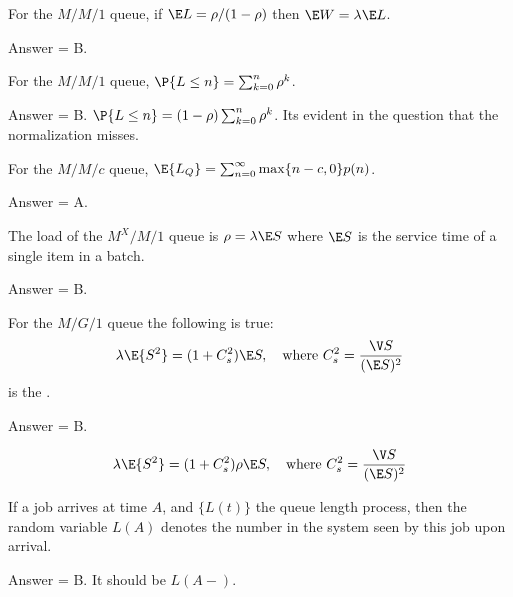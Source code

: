 \begin{exercise}[201803]
For the $M/M/1$ queue, if $\E L = \rho/(1-\rho)$ then $\E W = \lambda \E L$.
\begin{solution}
Answer = B.
\end{solution}
\end{exercise}

\begin{exercise}[201803]
For the $M/M/1$ queue, $\P{L\leq n} = \sum_{k=0}^n \rho^k$.
\begin{solution}
Answer = B. $\P{L\leq n} = (1-\rho)\sum_{k=0}^n \rho^k$. Its evident in the question that the normalization misses.
\end{solution}
\end{exercise}

\begin{exercise}[201803]
For the $M/M/c$ queue, $\E{L_Q} = \sum_{n=0}^\infty \max\{n-c, 0\} p(n)$. 
\begin{solution}
Answer = A.
\end{solution}
\end{exercise}

\begin{exercise}[201803]
The load of the $M^X/M/1$ queue is $\rho = \lambda \E S$ where $\E S$ is the service time of a single item in a batch.
\begin{solution}
Answer = B.
\end{solution}
\end{exercise}

\begin{exercise}[201803]
For the $M/G/1$ queue the following is true:
\begin{equation}
 \lambda \E{S^2} = (1+C_s^2)\E S, \quad\text{where } C_s^2 = \frac{\V S }{(\E S)^2}
\end{equation}
is the .
\begin{solution}
Answer = B.

\begin{equation}
 \lambda \E{S^2} = (1+C_s^2)\rho\E S, \quad\text{where }
 C_s^2 = \frac{\V S }{(\E S)^2}
\end{equation}
\end{solution}
\end{exercise}

\begin{exercise}[201803]
If a job arrives at time $A$, and $\{L(t)\}$ the queue length process, then the random variable $L(A)$ denotes the number in the system seen by this job upon arrival.
\begin{solution}
Answer = B. It should be $L(A-)$.
\end{solution}
\end{exercise}

